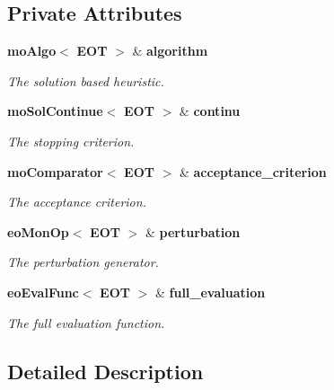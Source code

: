 \subsection*{Private Attributes}
\begin{CompactItemize}
\item 
{\bf mo\-Algo}$<$ {\bf EOT} $>$ \& {\bf algorithm}\label{classmo_i_l_s_r0}

\begin{CompactList}\small\item\em The solution based heuristic. \item\end{CompactList}\item 
{\bf mo\-Sol\-Continue}$<$ {\bf EOT} $>$ \& {\bf continu}\label{classmo_i_l_s_r1}

\begin{CompactList}\small\item\em The stopping criterion. \item\end{CompactList}\item 
{\bf mo\-Comparator}$<$ {\bf EOT} $>$ \& {\bf acceptance\_\-criterion}\label{classmo_i_l_s_r2}

\begin{CompactList}\small\item\em The acceptance criterion. \item\end{CompactList}\item 
{\bf eo\-Mon\-Op}$<$ {\bf EOT} $>$ \& {\bf perturbation}\label{classmo_i_l_s_r3}

\begin{CompactList}\small\item\em The perturbation generator. \item\end{CompactList}\item 
{\bf eo\-Eval\-Func}$<$ {\bf EOT} $>$ \& {\bf full\_\-evaluation}\label{classmo_i_l_s_r4}

\begin{CompactList}\small\item\em The full evaluation function. \item\end{CompactList}\end{CompactItemize}


\subsection{Detailed Description}
